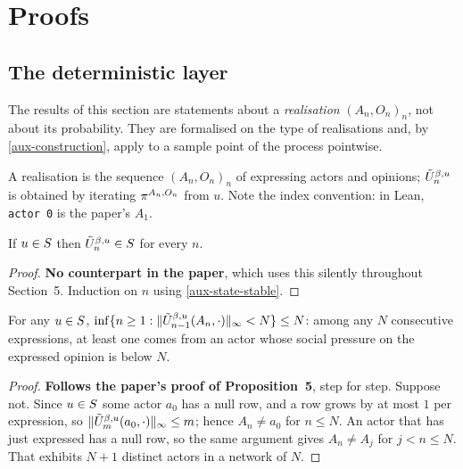 \chapter{Proofs}
\label{chap:proofs}

\section{The deterministic layer}

The results of this section are statements about a \emph{realisation} $(A_n,
O_n)_n$, not about its probability.  They are formalised on the type of
realisations and, by \ref{aux-construction}, apply to a sample point of the
process pointwise.

\begin{definition}[Realisations]
  \label{aux-trajectory}
  \leanok
  A realisation is the sequence $(A_n, O_n)_n$ of expressing actors and
  opinions; $\tilde{U}^{\beta,u}_n$ is obtained by iterating $\pi^{A_n,O_n}$ from
  $u$.  Note the index convention: in Lean, \texttt{actor 0} is the paper's
  $A_1$.
\end{definition}

\begin{lemma}
  \label{aux-state-along}
  \leanok
  If $u \in S$ then $\tilde{U}^{\beta,u}_n \in S$ for every $n$.
\end{lemma}
\begin{proof}
  \leanok
  \textbf{No counterpart in the paper}, which uses this silently throughout
  Section~5.  Induction on $n$ using \ref{aux-state-stable}.
\end{proof}

\begin{proposition}
  \label{prop5}
  \leanok
  For any $u \in S$,
  $\inf\{ n \ge 1 : \|\tilde{U}^{\beta,u}_{n-1}(A_n,\cdot)\|_\infty < N \} \le N$: among any
  $N$ consecutive expressions, at least one comes from an actor whose social
  pressure on the expressed opinion is below $N$.
\end{proposition}
\begin{proof}
  \leanok
  \textbf{Follows the paper's proof of Proposition~5}, step for step.
  Suppose not.  Since $u \in S$ some actor $a_0$ has a null row, and a row
  grows by at most $1$ per expression, so $\|\tilde{U}^{\beta,u}_m(a_0,\cdot)\|_\infty \le m$;
  hence $A_n \ne a_0$ for $n \le N$.  An actor that has just expressed has a null
  row, so the same argument gives $A_n \ne A_j$ for $j < n \le N$.  That exhibits
  $N+1$ distinct actors in a network of $N$.
\end{proof}

